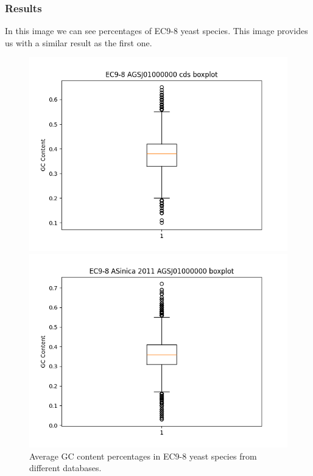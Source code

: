\documentclass{beamer}
\begin{document}
\begin{frame}
  \frametitle{Results}
    In this image we can see percentages of EC9-8 yeast species. This image provides us with a similar result as the first one.
  \begin{figure}
    \centering
    \begin{minipage}{0.48\textwidth}
      \includegraphics[width=\linewidth]{images/EC9-8_AGSJ01000000_cds_boxplot.png}
    \end{minipage}\hfill
    \begin{minipage}{0.48\textwidth}
      \includegraphics[width=\linewidth]{images/EC9-8_ASinica_2011_AGSJ01000000_boxplot.png}
    \end{minipage}
    \caption{Average GC content percentages in EC9-8 yeast species from different databases.}
  \end{figure}
\end{frame}
\end{document}
